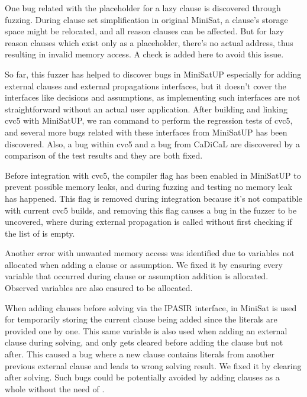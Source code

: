 One bug related with the placeholder for a lazy clause is discovered through fuzzing. During clause set simplification in original MiniSat, a clause's storage space might be relocated, and all reason clauses can be affected. But for lazy reason clauses which exist only as a placeholder, there's no actual address, thus resulting in invalid memory access. A check is added here to avoid this issue.

So far, this fuzzer has helped to discover bugs in MiniSatUP especially for adding external clauses and external propagations interfaces, but it doesn't cover the interfaces like decisions and assumptions, as implementing such interfaces are not straightforward without an actual user application. After building and linking cvc5 with MiniSatUP, we ran  command to perform the regression tests of cvc5, and several more bugs related with these interfaces from MiniSatUP has been discovered. Also, a bug within cvc5 and a bug from CaDiCaL are discovered by a comparison of the test results and they are both fixed.

Before integration with cvc5, the compiler flag  has been enabled in MiniSatUP to prevent possible memory leaks, and during fuzzing and testing no memory leak has happened. This flag is removed during integration because it's not compatible with current cvc5 builds, and removing this flag causes a bug in the fuzzer to be uncovered, where during external propagation  is called without first checking if the list of  is empty.

Another error with unwanted memory access was identified due to variables not allocated when adding a clause or assumption. We fixed it by ensuring every variable that occurred during clause or assumption addition is allocated. Observed variables are also ensured to be allocated.

When adding clauses before solving via the IPASIR interface,  in MiniSat is used for temporarily storing the current clause being added since the literals are provided one by one. This same variable is also used when adding an external clause during solving, and only gets cleared before adding the clause but not after. This caused a bug where a new clause contains literals from another previous external clause and leads to wrong solving result. We fixed it by clearing  after solving. Such bugs could be potentially avoided by adding clauses as a whole without the need of .

